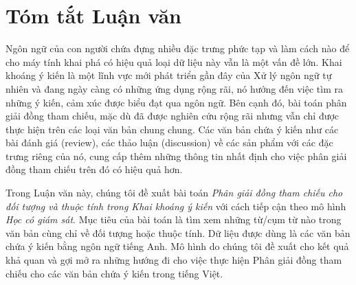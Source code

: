 \documentclass[12pt]{report}
\begin{document}
	\chapter{Tóm tắt Luận văn}	
		\par Ngôn ngữ của con người chứa đựng nhiều đặc trưng phức tạp và làm cách nào để cho máy tính khai phá có hiệu quả loại dữ liệu này vẫn là một vấn đề lớn. Khai khoáng ý kiến là một lĩnh vực mới phát triển gần đây của Xử lý ngôn ngữ tự nhiên và đang ngày càng có những ứng dụng rộng rãi, nó hướng đến việc tìm ra những ý kiến, cảm xúc được biểu đạt qua ngôn ngữ. Bên cạnh đó, bài toán phân giải đồng tham chiếu, mặc dù đã được nghiên cứu rộng rãi nhưng vẫn chỉ được thực hiện trên các loại văn bản chung chung. Các văn bản chứa ý kiến như các bài đánh giá (review), các thảo luận (discussion) về các sản phẩm với các đặc trưng riêng của nó, cung cấp thêm những thông tin nhất định cho việc phân giải đồng tham chiếu trên đó có hiệu quả hơn. 
		\par Trong Luận văn này, chúng tôi đề xuất bài toán \textit{Phân giải đồng tham chiếu cho đối tượng và thuộc tính trong Khai khoáng ý kiến} với cách tiếp cận theo mô hình \textit{Học có giám sát}. Mục tiêu của bài toán là tìm xem những từ/cụm từ nào trong văn bản cùng chỉ về đối tượng hoặc thuộc tính. Dữ liệu được dùng là các văn bản chứa ý kiến bằng ngôn ngữ tiếng Anh. Mô hình do chúng tôi đề xuất cho kết quả khả quan và gợi mở ra những hướng đi cho việc thực hiện Phân giải đồng tham chiếu cho các văn bản chứa ý kiến trong tiếng Việt.
		
\end{document}
